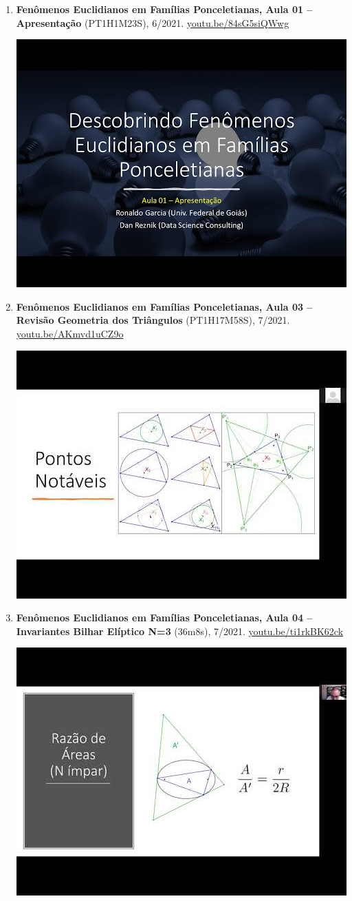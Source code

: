 \documentclass[12pt]{article}
\begin{document}
\begin{enumerate}[resume]
\item \textbf{Fenômenos Euclidianos em Famílias Ponceletianas, Aula 01 -- Apresentação} (PT1H1M23S), 6/2021. \href{https://youtu.be/84sG5siQWwg}{\url{youtu.be/84sG5siQWwg}}
\begin{center}\includegraphics[width=.5\textwidth]{pics/84sG5siQWwg.jpg}\end{center}
% 
\item \textbf{Fenômenos Euclidianos em Famílias Ponceletianas, Aula 03 -- Revisão Geometria dos Triângulos} (PT1H17M58S), 7/2021. \href{https://youtu.be/AKmvd1uCZ9o}{\url{youtu.be/AKmvd1uCZ9o}}
\begin{center}\includegraphics[width=.5\textwidth]{pics/AKmvd1uCZ9o.jpg}\end{center}
% 
\item \textbf{Fenômenos Euclidianos em Famílias Ponceletianas, Aula 04 -- Invariantes Bilhar Elíptico N=3} (36m8s), 7/2021. \href{https://youtu.be/ti1rkBK62ck}{\url{youtu.be/ti1rkBK62ck}}
\begin{center}\includegraphics[width=.5\textwidth]{pics/ti1rkBK62ck.jpg}\end{center}

\end{enumerate}
\end{document}
